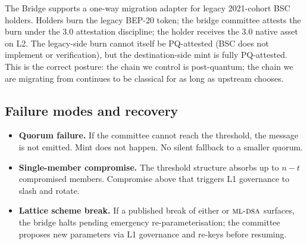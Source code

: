 The \Zoo{} Bridge supports a one-way migration adapter for legacy
2021-cohort BSC \Zoo{} holders. Holders burn the legacy BEP-20
token; the bridge committee attests the burn under the 3.0
attestation discipline; the holder receives the \Zoo{} 3.0 native
asset on \Zoo{} L2. The legacy-side burn cannot itself be PQ-attested
(BSC does not implement \MLDSA{} or \Ringtail{} verification), but
the destination-side mint is fully PQ-attested. This is the
correct posture: the chain we control is post-quantum; the chain
we are migrating from continues to be classical for as long as
upstream chooses.

\subsection{Failure modes and recovery}

\begin{itemize}[leftmargin=1.2em]
  \item \textbf{Quorum failure.} If the committee cannot reach the
        threshold, the message is not emitted. Mint does not happen.
        No silent fallback to a smaller quorum.
  \item \textbf{Single-member compromise.} The threshold structure
        absorbs up to $n - t$ compromised members. Compromise above
        that triggers L1 governance to slash and rotate.
  \item \textbf{Lattice scheme break.} If a published break of either
        \Ringtail{} or $\textsc{ml-dsa}{}$ surfaces, the bridge halts pending
        emergency re-parameterisation; the committee proposes new
        parameters via L1 governance and re-keys before resuming.
\end{itemize}

